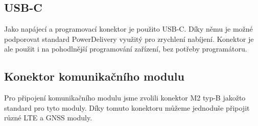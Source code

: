 \subsection{USB-C}
Jako napájecí a programovací konektor je použito USB-C.
Díky němu je možné podporovat standard PowerDelivery využitý pro zrychlení nabíjení.
Konektor je ale použit i na pohodlnější programování zařízení, bez potřeby programátoru.

\subsection{Konektor komunikačního modulu}
Pro připojení komunikačního modulu jsme zvolili konektor M2 typ-B jakožto standard pro tyto moduly.
Díky tomuto konektoru můžeme jednoduše připojit různé LTE a GNSS moduly.








